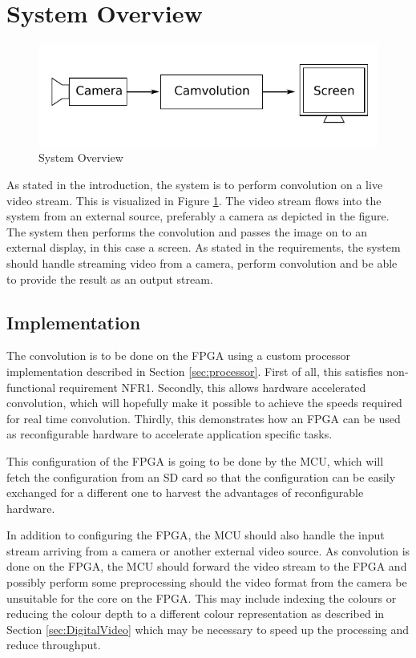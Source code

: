 \section{System Overview}


\begin{figure}[h]
    \centering
    \includegraphics{img/SystemOverview.pdf}
    \caption{System Overview}
    \label{fig:SystemOverview}
\end{figure}

As stated in the introduction, the system is to perform convolution on a live video stream.
This is visualized in Figure \ref{fig:SystemOverview}.
The video stream flows into the system from an external source, preferably a camera as depicted in the figure.
The system then performs the convolution and passes the image on to an external display, in this case a screen.
As stated in the requirements, the system should handle streaming video from a camera, perform convolution and be able to provide the result as an output stream.

\subsection{Implementation}
The convolution is to be done on the FPGA using a custom processor implementation described in Section \ref{sec:processor}.
First of all, this satisfies non-functional requirement NFR1.
Secondly, this allows hardware accelerated convolution, which will hopefully make it possible to achieve the speeds required for real time convolution.
Thirdly, this demonstrates how an FPGA can be used as reconfigurable hardware to accelerate application specific tasks.

This configuration of the FPGA is going to be done by the MCU, which will fetch the configuration from an SD card so that the configuration can be easily exchanged for a different one to harvest the advantages of reconfigurable hardware.

In addition to configuring the FPGA, the MCU should also handle the input stream arriving from a camera or another external video source.
As convolution is done on the FPGA, the MCU should forward the video stream to the FPGA and possibly perform some preprocessing should the video format from the camera be unsuitable for the core on the FPGA.
This may include indexing the colours or reducing the colour depth to a different colour representation as described in Section \ref{sec:DigitalVideo} which may be necessary to speed up the processing and reduce throughput.

